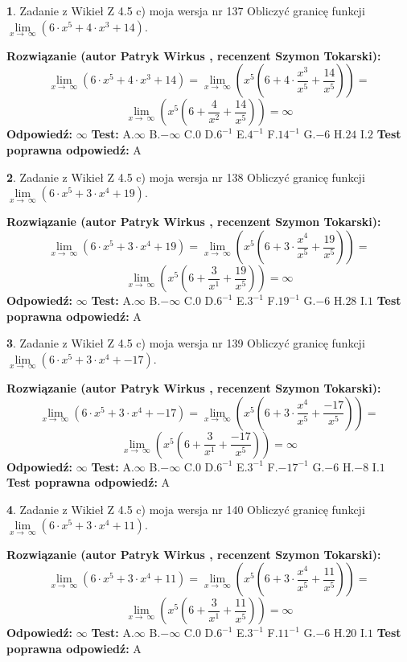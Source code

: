 \documentclass[12pt, a4paper]{article}
\theoremstyle{definition} %
\newtheorem{zad}{}
\newcommand{\zadStart}[1]{\begin{zad}#1\newline}
\newcommand{\zadStop}{\end{zad}}
\newcommand{\rozwStart}[2]{\noindent \textbf{Rozwiązanie (autor #1 , recenzent #2): }\newline}
\newcommand{\rozwStop}{\newline}
\newcommand{\odpStart}{\noindent \textbf{Odpowiedź:}\newline}
\newcommand{\odpStop}{\newline}
\newcommand{\testStart}{\noindent \textbf{Test:}\newline}
\newcommand{\testStop}{\newline}
\newcommand{\kluczStart}{\noindent \textbf{Test poprawna odpowiedź:}\newline}
\newcommand{\kluczStop}{\newline}
\begin{document}
\zadStart{Zadanie z Wikieł Z 4.5 c) moja wersja nr 137}
Obliczyć granicę funkcji  $\lim\limits_{x\to\ \infty}(6 \cdot x^{5}+4 \cdot x^{3}+14)$.
\zadStop
\rozwStart{Patryk Wirkus}{Szymon Tokarski}
$$\lim\limits_{x\to\ \infty}(6 \cdot x^{5}+4 \cdot x^{3}+14) = \lim\limits_{x\to\ \infty}(x^{5}(6 +4 \cdot \frac{x^{3}}{x^{5}}+\frac{14}{x^{5}})) =$$ $$\lim\limits_{x\to\ \infty}(x^{5}(6 +\frac{4}{x^{2}}+\frac{14}{x^{5}})) =\infty$$
\rozwStop
\odpStart
$\infty$
\odpStop
\testStart
A.$\infty$ B.$-\infty$ C.$0$ D.$6^{-1}$ E.$4^{-1}$
F.$14^{-1}$ G.$-6$
H.$24$
I.$2$
\testStop
\kluczStart
A
\kluczStop



\zadStart{Zadanie z Wikieł Z 4.5 c) moja wersja nr 138}
Obliczyć granicę funkcji  $\lim\limits_{x\to\ \infty}(6 \cdot x^{5}+3 \cdot x^{4}+19)$.
\zadStop
\rozwStart{Patryk Wirkus}{Szymon Tokarski}
$$\lim\limits_{x\to\ \infty}(6 \cdot x^{5}+3 \cdot x^{4}+19) = \lim\limits_{x\to\ \infty}(x^{5}(6 +3 \cdot \frac{x^{4}}{x^{5}}+\frac{19}{x^{5}})) =$$ $$\lim\limits_{x\to\ \infty}(x^{5}(6 +\frac{3}{x^{1}}+\frac{19}{x^{5}})) =\infty$$
\rozwStop
\odpStart
$\infty$
\odpStop
\testStart
A.$\infty$ B.$-\infty$ C.$0$ D.$6^{-1}$ E.$3^{-1}$
F.$19^{-1}$ G.$-6$
H.$28$
I.$1$
\testStop
\kluczStart
A
\kluczStop



\zadStart{Zadanie z Wikieł Z 4.5 c) moja wersja nr 139}
Obliczyć granicę funkcji  $\lim\limits_{x\to\ \infty}(6 \cdot x^{5}+3 \cdot x^{4}+-17)$.
\zadStop
\rozwStart{Patryk Wirkus}{Szymon Tokarski}
$$\lim\limits_{x\to\ \infty}(6 \cdot x^{5}+3 \cdot x^{4}+-17) = \lim\limits_{x\to\ \infty}(x^{5}(6 +3 \cdot \frac{x^{4}}{x^{5}}+\frac{-17}{x^{5}})) =$$ $$\lim\limits_{x\to\ \infty}(x^{5}(6 +\frac{3}{x^{1}}+\frac{-17}{x^{5}})) =\infty$$
\rozwStop
\odpStart
$\infty$
\odpStop
\testStart
A.$\infty$ B.$-\infty$ C.$0$ D.$6^{-1}$ E.$3^{-1}$
F.$-17^{-1}$ G.$-6$
H.$-8$
I.$1$
\testStop
\kluczStart
A
\kluczStop



\zadStart{Zadanie z Wikieł Z 4.5 c) moja wersja nr 140}
Obliczyć granicę funkcji  $\lim\limits_{x\to\ \infty}(6 \cdot x^{5}+3 \cdot x^{4}+11)$.
\zadStop
\rozwStart{Patryk Wirkus}{Szymon Tokarski}
$$\lim\limits_{x\to\ \infty}(6 \cdot x^{5}+3 \cdot x^{4}+11) = \lim\limits_{x\to\ \infty}(x^{5}(6 +3 \cdot \frac{x^{4}}{x^{5}}+\frac{11}{x^{5}})) =$$ $$\lim\limits_{x\to\ \infty}(x^{5}(6 +\frac{3}{x^{1}}+\frac{11}{x^{5}})) =\infty$$
\rozwStop
\odpStart
$\infty$
\odpStop
\testStart
A.$\infty$ B.$-\infty$ C.$0$ D.$6^{-1}$ E.$3^{-1}$
F.$11^{-1}$ G.$-6$
H.$20$
I.$1$
\testStop
\kluczStart
A
\kluczStop
\end{document}
